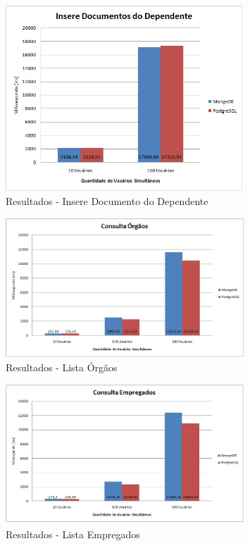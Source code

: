 \begin{figure}[!htbp]
	\begin{center}
		\includegraphics[width=0.8\textwidth]{resultados/insere_doc_dependentes}
	\end{center}
	\caption{Resultados - Insere Documento do Dependente}
	\label{fig:resultinseredocdependente}
\end{figure}

\begin{figure}[!htbp]
	\begin{center}
		\includegraphics[width=0.8\textwidth]{resultados/consulta_orgaos}
	\end{center}
	\caption{Resultados - Lista Órgãos}
	\label{fig:resultlistaorgaos}
\end{figure}

\begin{figure}[!htbp]
	\begin{center}
		\includegraphics[width=0.8\textwidth]{resultados/consulta_empregados}
	\end{center}
	\caption{Resultados - Lista Empregados}
	\label{fig:resultlistaempregados}
\end{figure}

